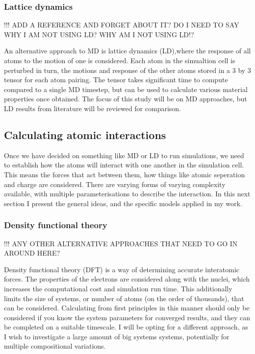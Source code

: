 \subsubsection{Lattice dynamics}

!!! ADD A REFERENCE AND FORGET ABOUT IT? DO I NEED TO SAY WHY I AM NOT USING LD? WHY AM I NOT USING LD!?

An alternative approach to MD is lattice dynamics (LD),where the response of all atoms to the motion of one is considered. Each atom in the simualtion cell is perturbed in turn, the motions and response of the other atoms stored  in a 3 by 3 tensor for each atom pairing. The tensor takes significant time to compute compared to a single MD timestep, but can be used to calculate various material properties once obtained. The focus of this study will be on MD approaches, but LD results from literature will be reviewed for comparison.



\subsection{Calculating atomic interactions}

Once we have decided on something like MD or LD to run simulations, we need to establish how the atoms will interact with one another in the simulation cell. This means the forces that act between them, how things like atomic seperation and charge are considered. There are varying forms of varying complexity available, with multiple parameterisations to describe the interaction. In this next section I present the general ideas, and the specific models applied in my work.

\subsubsection{Density functional theory}

!!! ANY OTHER ALTERNATIVE APPROACHES THAT NEED TO GO IN AROUND HERE?

Density functional theory (DFT) is a way of determining accurate interatomic forces. The properties of the electrons are considered along with the nuclei, which increases the computational cost and simulation run time. This additionally limits the size of systems, or number of atoms (on the order of thousands), that can be considered. Calculating from first principles in this manner should only be considered if you know the system parameters for converged results, and they can be completed on a suitable timescale. I will be opting for a different approach, as I wish to investigate a large amount of big systems systems, potentially for multiple compositional variations.

